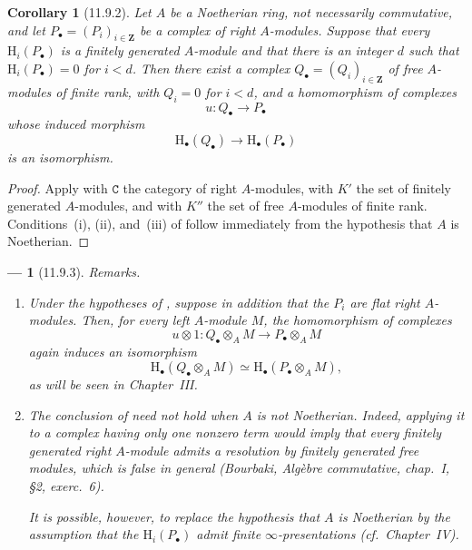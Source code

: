 \documentclass[oneside]{amsart}
\theoremstyle{ega-env-style}
\newtheorem*{env}{---}
\theoremstyle{ega-thm-env-style}
\newtheorem*{corollary}{Corollary}
\theoremstyle{ega-defn-env-style}
\def\bb{\mathbf}                    %
\def\cat{\mathtt}                   %
\def\HH{\mathrm{H}}                 %
\def\isoto{\simeq} %
\let\EGAOriginalLabel\label
\renewcommand{\label}[1]{\phantomsection\EGAOriginalLabel{#1}}
\begin{document}
\begin{corollary}[11.9.2]
\label{0.11.9.2}
Let $A$ be a Noetherian ring, not necessarily commutative, and let
$P_\bullet=(P_i)_{i\in\bb{Z}}$ be a complex of right $A$-modules.
Suppose that every $\HH_i(P_\bullet)$ is a finitely generated
$A$-module and that there is an integer $d$ such that
$\HH_i(P_\bullet)=0$ for $i<d$.
Then there exist a complex $Q_\bullet=(Q_i)_{i\in\bb{Z}}$ of free
$A$-modules of finite rank, with $Q_i=0$ for $i<d$, and a homomorphism
of complexes
\[
  u:Q_\bullet\longrightarrow P_\bullet
\]
whose induced morphism
\[
  \HH_\bullet(Q_\bullet)\longrightarrow\HH_\bullet(P_\bullet)
\]
is an isomorphism.
\end{corollary}

\begin{proof}
Apply  with $\cat{C}$ the category of right
$A$-modules, with $K'$ the set of finitely generated $A$-modules, and
with $K''$ the set of free $A$-modules of finite rank.
Conditions~(i), (ii), and~(iii) of  follow immediately
from the hypothesis that $A$ is Noetherian.
\end{proof}

\begin{env}[11.9.3]
\label{0.11.9.3}
\emph{Remarks}.
\begin{enumerate}
  \item[{\rm(i)}]
  Under the hypotheses of , suppose in addition that the
  $P_i$ are flat right $A$-modules.
  Then, for every left $A$-module $M$, the homomorphism of complexes
  \[
    u\otimes 1:
    Q_\bullet\otimes_A M
    \longrightarrow
    P_\bullet\otimes_A M
  \]
  again induces an isomorphism
  \[
    \HH_\bullet(Q_\bullet\otimes_A M)
    \isoto
    \HH_\bullet(P_\bullet\otimes_A M),
  \]
  as will be seen in Chapter~III.

  \item[{\rm(ii)}]
  The conclusion of  need not hold when $A$ is not
  Noetherian.
  Indeed, applying it to a complex having only one nonzero term would
  imply that every finitely generated right $A$-module admits a resolution by
  finitely generated free modules, which is false in general
  (Bourbaki, \emph{Alg\`ebre commutative}, chap.~I, \S2, exerc.~6).

  It is possible, however, to replace the hypothesis that $A$ is
  Noetherian by the assumption that the $\HH_i(P_\bullet)$ admit finite
  $\infty$-presentations (cf.\ Chapter~IV).
\end{enumerate}
\end{env}
\end{document}

